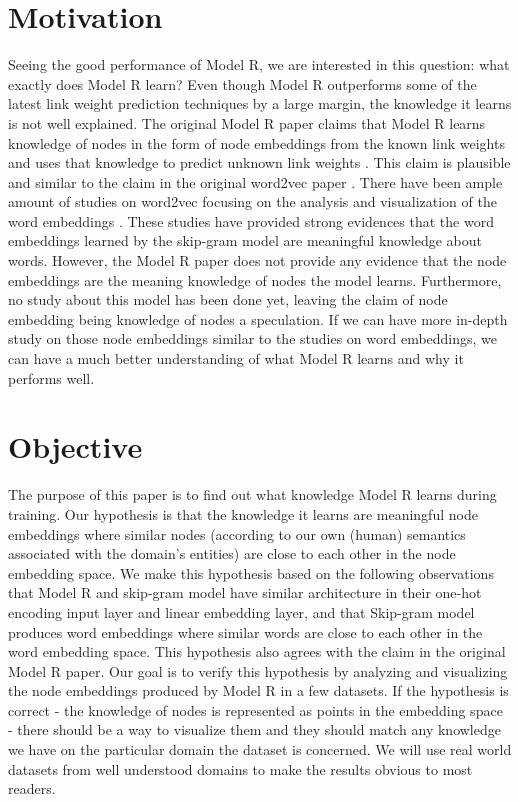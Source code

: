 \documentclass[conference]{IEEEtran}
\begin{document}
\section{Motivation}
Seeing the good performance of Model R, we are interested in this question: what exactly does Model R learn?
Even though Model R outperforms some of the latest link weight prediction techniques by a large margin, the knowledge it learns is not well explained.
The original Model R paper claims that Model R learns knowledge of nodes in the form of node embeddings from the known link weights and uses that knowledge to predict unknown link weights \cite{hou2017deep}.
This claim is plausible and similar to the claim in the original word2vec paper \cite{mikolov2013linguistic}.
There have been ample amount of studies on word2vec focusing on the analysis and visualization of the word embeddings \cite{mikolov2013distributed} \cite{mikolov2013linguistic}.
These studies have provided strong evidences that the word embeddings learned by the skip-gram model are meaningful knowledge about words.
However, the Model R paper does not provide any evidence that the node embeddings are the meaning knowledge of nodes the model learns.
Furthermore, no study about this model has been done yet, leaving the claim of node embedding being knowledge of nodes a speculation.
If we can have more in-depth study on those node embeddings similar to the studies on word embeddings, we can have a much better understanding of what Model R learns and why it performs well.

\section{Objective}
The purpose of this paper is to find out what knowledge Model R learns during training.
Our hypothesis is that the knowledge it learns are meaningful node embeddings where similar nodes (according to our own (human) semantics associated with the domain's entities) are close to each other in the node embedding space.
We make this hypothesis based on the following observations that Model R and skip-gram model have similar architecture in their one-hot encoding input layer and linear embedding layer, and that Skip-gram model produces word embeddings where similar words are close to each other in the word embedding space.
This hypothesis also agrees with the claim in the original Model R paper.
Our goal is to verify this hypothesis by analyzing and visualizing the node embeddings produced by Model R in a few datasets.
If the hypothesis is correct - the knowledge of nodes is represented as points in the embedding space - there should be a way to visualize them and they should match any knowledge we have on the particular domain the dataset is concerned.
We will use real world datasets from well understood domains to make the results obvious to most readers.
\end{document}

